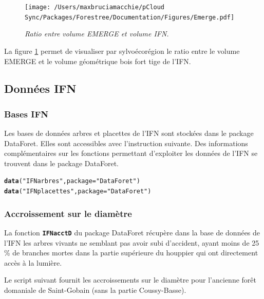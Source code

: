 \documentclass{article}\usepackage[]{graphicx}\usepackage[]{color}
\makeatletter
\newcommand{\hlstr}[1]{\textcolor[rgb]{0.192,0.494,0.8}{#1}}%
\newcommand{\hlstd}[1]{\textcolor[rgb]{0.345,0.345,0.345}{#1}}%
\newcommand{\hlkwc}[1]{\textcolor[rgb]{0.333,0.667,0.333}{#1}}%
\newcommand{\hlkwd}[1]{\textcolor[rgb]{0.737,0.353,0.396}{\textbf{#1}}}%
\newenvironment{kframe}{%
 \def\at@end@of@kframe{}%
 \ifinner\ifhmode%
  \def\at@end@of@kframe{\end{minipage}}%
  \begin{minipage}{\columnwidth}%
 \fi\fi%
 \def\FrameCommand##1{\hskip\@totalleftmargin \hskip-\fboxsep
 \colorbox{shadecolor}{##1}\hskip-\fboxsep
     \hskip-\linewidth \hskip-\@totalleftmargin \hskip\columnwidth}%
 \MakeFramed {\advance\hsize-\width
   \@totalleftmargin\z@ \linewidth\hsize
   \@setminipage}}%
 {\par\unskip\endMakeFramed%
 \at@end@of@kframe}
\newenvironment{knitrout}{}{} %
\makeatother
\begin{document}
\begin{figure}[H]
\begin{center}
 \texttt{[image: /Users/maxbruciamacchie/pCloud Sync/Packages/Forestree/Documentation/Figures/Emerge.pdf]}
\caption{\emph{Ratio entre volume EMERGE et volume IFN.}}
\label{Emerge}
\end{center}
\end{figure}

La figure \ref{Emerge} permet de visualiser par sylvoécorégion le ratio entre le volume EMERGE et le volume géométrique bois fort tige de l'IFN.



\newpage
\subsection{Données IFN}

\subsubsection{Bases IFN}
Les bases de données arbres et placettes de l'IFN sont stockées dans le package DataForet. Elles sont accessibles avec l'instruction suivante. Des informations complémentaires sur les fonctions permettant d'exploiter les données de l'IFN se trouvent dans le package DataForet.

\begin{knitrout}\small
{}\color{fgcolor}\begin{kframe}
\begin{alltt}
\hlkwd{data}\hlstd{(}\hlstr{"IFNarbres"}\hlstd{,} \hlkwc{package} \hlstd{=} \hlstr{"DataForet"}\hlstd{)}
\hlkwd{data}\hlstd{(}\hlstr{"IFNplacettes"}\hlstd{,} \hlkwc{package} \hlstd{=} \hlstr{"DataForet"}\hlstd{)}
\end{alltt}
\end{kframe}
\end{knitrout}

\subsubsection{Accroissement sur le diamètre}
La fonction \textbf{\texttt{IFNacctD}} du package DataForet récupère dans la base de données de l'IFN les arbres vivants ne semblant pas avoir subi d'accident, ayant moins de 25 \% de branches mortes dans la partie supérieure du houppier qui ont directement accès à la lumière.

Le script suivant fournit les accroissements sur le diamètre pour l'ancienne forêt domaniale de Saint-Gobain (sans la partie Coussy-Basse).
\end{document}

